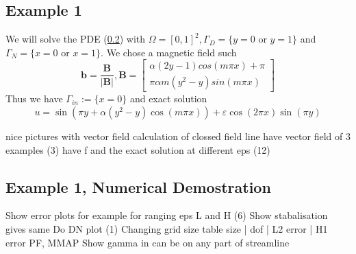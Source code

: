 \documentclass[12pt,a4paper]{article}
\begin{document}
\subsection{Example 1}
We will solve the PDE (\ref{}) with $\Omega = [0,1]^2, \Gamma_D = \{y=0 \text{ or } y=1\}$ and $\Gamma_N = \{x=0 \text{ or } x=1\}$. We chose a magnetic field such
\begin{equation}
\mathbf{b} = \frac{\mathbf{B}}{|\mathbf{B}|}, 
\mathbf{B} = \left[ \begin{matrix}
\alpha(2y-1)cos(m\pi x) + \pi\\
\pi \alpha m (y^2-y)sin(m \pi x)
\end{matrix} \right]
\end{equation}
Thus we have $\Gamma_{in} := \{x=0\}$ and exact solution
\begin{equation}
u = \sin(\pi y + \alpha (y^2-y) \cos(m\pi x)) + \varepsilon \cos(2 \pi x) \sin(\pi y)
\end{equation}

nice pictures with vector field
calculation of clossed field line
have vector field of 3 examples (3)
have f and the exact solution at different eps (12)

\subsection{Example 1, Numerical Demostration}
Show error plots for example for ranging eps  L and H (6)
Show stabalisation gives same
Do DN plot (1)
Changing grid size table 
size | dof | L2 error | H1 error PF, MMAP
Show gamma in can be on any part of streamline
\end{document}

